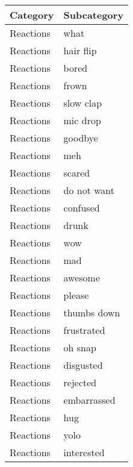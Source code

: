 \begin{supertabular}{l p{0.25\textwidth}}
\toprule
\textbf{Category} &               \textbf{Subcategory} \\
\midrule
        Reactions &                               what \\
        Reactions &                          hair flip \\
        Reactions &                              bored \\
        Reactions &                              frown \\
        Reactions &                          slow clap \\
        Reactions &                           mic drop \\
        Reactions &                            goodbye \\
        Reactions &                                meh \\
        Reactions &                             scared \\
        Reactions &                        do not want \\
        Reactions &                           confused \\
        Reactions &                              drunk \\
        Reactions &                                wow \\
        Reactions &                                mad \\
        Reactions &                            awesome \\
        Reactions &                             please \\
        Reactions &                        thumbs down \\
        Reactions &                         frustrated \\
        Reactions &                            oh snap \\
        Reactions &                          disgusted \\
        Reactions &                           rejected \\
        Reactions &                        embarrassed \\
        Reactions &                                hug \\
        Reactions &                               yolo \\
        Reactions &                         interested \\

\end{supertabular}

